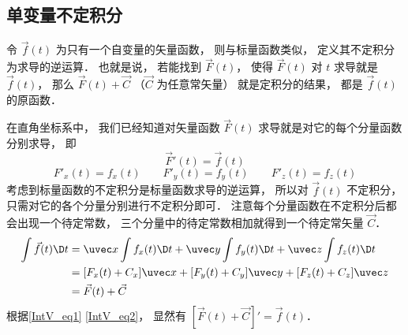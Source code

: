 

\subsection{单变量不定积分}
令 $\vec f(t)$ 为只有一个自变量的矢量函数， 则与标量函数类似， 定义其不定积分为求导的逆运算． 也就是说， 若能找到 $\vec F(t)$， 使得 $\vec F(t)$ 对 $t$ 求导就是 $\vec f(t)$， 那么 $\vec F(t) + \vec C$ （$\vec C$ 为任意常矢量） 就是定积分的结果， 都是 $\vec f(t)$ 的原函数．

在直角坐标系中， 我们已经知道对矢量函数 $\vec F(t)$ 求导就是对它的每个分量函数分别求导， 即
\begin{equation}\label{IntV_eq1}
\vec F'(t) = \vec f(t)
\end{equation}
\begin{equation}\label{IntV_eq2}
F'_x(t) = f_x(t) \qquad F'_y(t) = f_y(t) \qquad F'_z(t) = f_z(t)
\end{equation}
考虑到标量函数的不定积分是标量函数求导的逆运算， 所以对 $\vec f(t)$ 不定积分， 只需对它的各个分量分别进行不定积分即可． 注意每个分量函数在不定积分后都会出现一个待定常数， 三个分量中的待定常数相加就得到一个待定常矢量 $\vec C$．
\begin{equation}\begin{aligned}
\int \vec f(t) \D t &= \uvec x \int f_x(t) \D t + \uvec y \int f_y(t) \D t + \uvec z \int f_z(t) \D t\\
&= [F_x(t)+C_x]\uvec x + [F_y(t)+C_y]\uvec y + [F_z(t)+C_z]\uvec z\\
&= \vec F(t) + \vec C
\end{aligned}\end{equation}
根据\autoref{IntV_eq1} \autoref{IntV_eq2}， 显然有 $[\vec F(t) + \vec C]' = \vec f(t)$．

